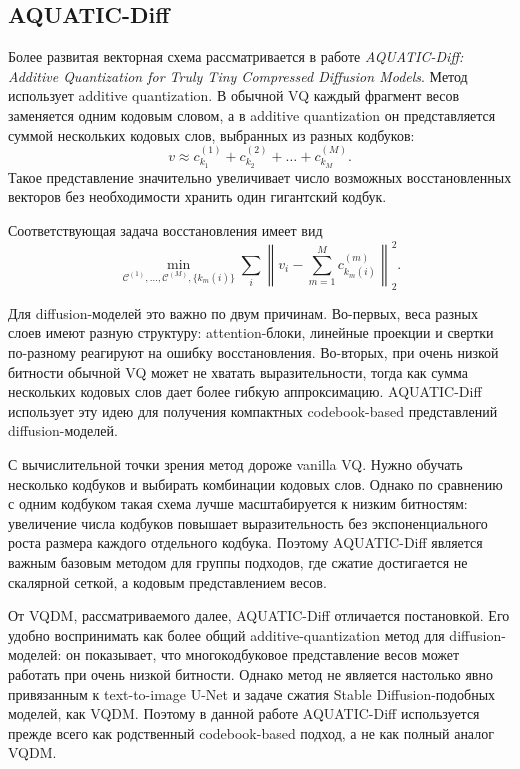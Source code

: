 \documentclass[a4paper,12pt]{article}
\begin{document}
\subsection{AQUATIC-Diff}

Более развитая векторная схема рассматривается в работе \textit{AQUATIC-Diff: Additive Quan\-ti\-za\-tion for Truly Tiny Com\-pressed Dif\-fu\-sion Models}. Метод использует additive quantization. В обычной VQ каждый фрагмент весов заменяется одним кодовым словом, а в additive quantization он представляется суммой нескольких кодовых слов, выбранных из разных кодбуков:
\[
    v \approx c^{(1)}_{k_1} + c^{(2)}_{k_2} + \ldots + c^{(M)}_{k_M}.
\]
Такое представление значительно увеличивает число возможных восстановленных векторов без необходимости хранить один гигантский кодбук.

Соответствующая задача восстановления имеет вид
\[
    \min_{\mathcal{C}^{(1)},\ldots,\mathcal{C}^{(M)}, \{k_m(i)\}}
    \sum_i
    \left\|
        v_i - \sum_{m=1}^{M} c^{(m)}_{k_m(i)}
    \right\|_2^2.
\]

Для diffusion-моделей это важно по двум причинам. Во-первых, веса разных слоев имеют разную структуру: attention-блоки, линейные проекции и свертки по-разному реагируют на ошибку восстановления. Во-вторых, при очень низкой битности обычной VQ может не хватать выразительности, тогда как сумма нескольких кодовых слов дает более гибкую аппроксимацию. AQUATIC-Diff использует эту идею для получения компактных codebook-based представлений diffusion-моделей.

С вычислительной точки зрения метод дороже vanilla VQ. Нужно обучать несколько кодбуков и выбирать комбинации кодовых слов. Однако по сравнению с одним кодбуком такая схема лучше масштабируется к низким битностям: увеличение числа кодбуков повышает выразительность без экспоненциального роста размера каждого отдельного кодбука. Поэтому AQUATIC-Diff является важным базовым методом для группы подходов, где сжатие достигается не скалярной сеткой, а кодовым представлением весов.

От VQDM, рассматриваемого далее, AQUATIC-Diff отличается постановкой. Его удобно воспринимать как более общий additive-quantization метод для diffusion-моделей: он показывает, что многокодбуковое представление весов может работать при очень низкой битности. Однако метод не является настолько явно привязанным к text-to-image U-Net и задаче сжатия Stable Diffusion-подобных моделей, как VQDM. Поэтому в данной работе AQUATIC-Diff используется прежде всего как родственный codebook-based подход, а не как полный аналог VQDM.
\end{document}
